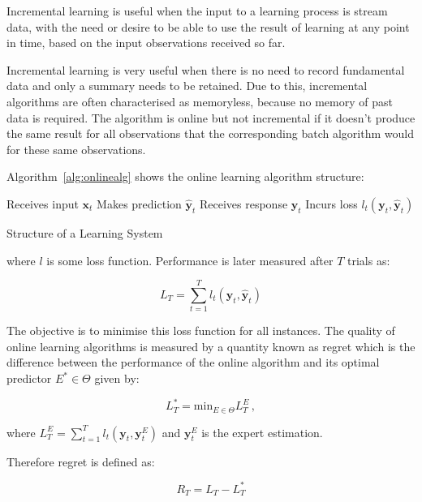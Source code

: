 Incremental learning is useful when the input to a learning process is stream
data, with the need or desire to be able to use the result of learning at any
point in time, based on the input observations received so far. 

Incremental learning is very useful when there is no need to record fundamental
data and only a summary needs to be retained. Due to this, incremental
algorithms are often characterised as memoryless, because no memory of past data
is required.  The algorithm is online but not incremental if it doesn't produce
the same result for all observations that the corresponding batch algorithm
would for these same observations.



Algorithm~\ref{alg:onlinealg} shows the online learning algorithm structure:

\begin{algorithm}[ht]
\begin{algorithmic}[1]
    \STATE Receives input $\mathbf{x}_t$
    \STATE Makes prediction $\mathbf{\hat{y}}_t$
    \STATE Receives response $\mathbf{y}_t$
    \STATE Incurs loss $l_t(\mathbf{y}_t,\mathbf{\hat{y}}_t)$
\end{algorithmic}
\caption{Structure of a Learning System}
\label{alg:onlinealg}
\end{algorithm}

\noindent where $l$ is some loss function. Performance is later measured after
$T$ trials as:

\begin{equation*}
L_T = \sum_{t=1}^T l_t(\mathbf{y}_t,\mathbf{\hat{y}}_t)
\end{equation*}

The objective is to minimise this loss function for all instances.
The quality of online learning algorithms is measured by a quantity known as
regret which is the difference between the performance of the online algorithm
and its optimal predictor $E^* \in \Theta$ given by:

\begin{equation*}
L^*_T= \text{min}_{E \in \Theta} L_T^E \, ,
\end{equation*}


\noindent where $L_T^E = \sum_{t=1}^T
l_t(\mathbf{y}_t,\mathbf{y}^E_t)$ and $\mathbf{y}^E_t$ is the expert estimation. 

Therefore regret is defined as:

\begin{equation*}
R_T = L_T - L^*_T
\end{equation*}

